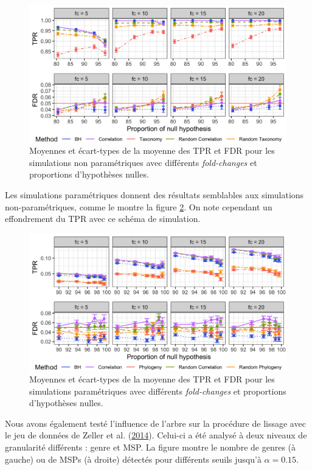 \documentclass[12pt,a4paper]{reedthesis}
\theoremstyle{definition}
\theoremstyle{definition}
\theoremstyle{definition}
\theoremstyle{remark}
\begin{document}
\begin{figure}[!t]

{\centering \includegraphics[width=0.9\linewidth]{img/tprfdr_cor_np} 

}

\caption{Moyennes et écart-types de la moyenne des TPR et FDR pour les simulations non paramétriques avec différents \emph{fold-changes} et proportions d'hypothèses nulles.}\label{fig:tprfdrcornp}
\end{figure}
Les simulations paramétriques donnent des résultats semblables aux simulations non-paramétriques, comme le montre la figure \ref{fig:tprfdrcorp}. On note cependant un effondrement du TPR avec ce schéma de simulation.


\begin{figure}[!t]

{\centering \includegraphics[width=0.9\linewidth]{img/tprfdr_cor_p} 

}

\caption{Moyennes et écart-types de la moyenne des TPR et FDR pour les simulations paramétriques avec différents \emph{fold-changes} et proportions d'hypothèses nulles.}\label{fig:tprfdrcorp}
\end{figure}
Nous avons également testé l'influence de l'arbre sur la procédure de lissage avec le jeu de données de Zeller et al. (\protect\hyperlink{ref-zeller2014potential}{2014}). Celui-ci a été analysé à deux niveaux de granularité différents : genre et MSP. La figure montre le nombre de genres (à gauche) ou de MSPs (à droite) détectés pour différents seuils jusqu'à \(\alpha = 0.15\).
\end{document}
